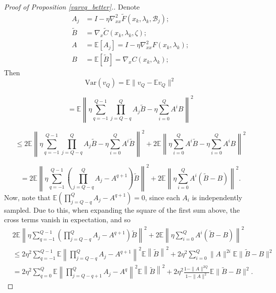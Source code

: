 \documentclass[11pt, twoside]{report}
\begin{document}
\begin{proof}[Proof of Proposition \ref{varvq_better}.]
Denote
\begin{align*}
    A_j &= I- \eta \nabla_{xx}^2 \tilde{F}(x_k,\lambda_k, \mathcal{B}_j); \\
    \tilde{B} &= \nabla_x \tilde{C} (x_k,\lambda_k,\zeta); \\
    A &= \mathbb{E} \left[ A_j \right] = I- \eta \nabla_{xx}^2 F(x_k,\lambda_k); \\
    B &= \mathbb{E} \left[\tilde{B} \right] = \nabla_x C (x_k,\lambda_k);
\end{align*}
Then 
\[\mathrm{Var}(v_Q) = \mathbb{E} \|v_Q - \mathbb{E}v_Q \|^2\]

\[= \mathbb{E} \left\|\eta \sum_{q=-1}^{Q-1} \prod_{j = Q-q}^Q A_j \tilde{B} - \eta \sum_{i=0}^Q A^i B \right\|^2\]

\[\leq 2 \mathbb{E} \left\| \eta \sum_{q=-1}^{Q-1} \prod_{j = Q-q}^Q A_j \tilde{B} - \eta \sum_{i=0}^Q A^i \tilde{B} \right\|^2 + 2\mathbb{E} \left\| \eta \sum_{i=0}^Q A^i \tilde{B} - \eta \sum_{i=0}^Q A^i B \right\|^2 \]

\[= 2 \mathbb{E} \left\| \eta \sum_{q=-1}^{Q-1} \left( \prod_{j = Q-q}^Q A_j - A^{q+1} \right) \tilde{B} \right\|^2 + 2\mathbb{E} \left\| \eta \sum_{i=0}^Q A^i (\tilde{B} - B) \right\|^2. \]
Now, note that $\mathbb{E}\left( \prod_{j = Q-q}^Q A_j - A^{q+1} \right) = 0$, since each $A_i$ is independently sampled. Due to this, when expanding the square of the first sum above, the cross terms vanish in expectation, and so
{\setlength{\abovedisplayskip}{6pt}
 \setlength{\belowdisplayskip}{6pt}
\begin{align*}
& 2 \mathbb{E} \left\| \eta \sum_{q=-1}^{Q-1} 
   \left( \prod_{j = Q-q}^Q A_j - A^{q+1} \right) \tilde{B} \right\|^2 + 2\mathbb{E} \left\| \eta \sum_{i=0}^Q A^i (\tilde{B} - B) \right\|^2 \\
&\leq 2 \eta^2 \sum_{q=-1}^{Q-1} 
   \mathbb{E} \left\| \prod_{j = Q-q}^Q A_j - A^{q+1} \right\|^2 
   \mathbb{E} \left\| \tilde{B} \right\|^2 + 2\eta^2 \sum_{i=0}^Q \|  A \|^{2i} \mathbb{E} \|\tilde{B} - B\|^2 \\
&= 2 \eta^2 \sum_{q=0}^{Q} 
   \mathbb{E} \left\| \prod_{j = Q-q+1}^Q A_j - A^{q} \right\|^2 
   \mathbb{E} \left\| \tilde{B} \right\|^2 + 2\eta^2 \frac{1-\|A\|^{2Q}}{1-\|A\|^2} 
   \mathbb{E} \|\tilde{B} - B\|^2.
\end{align*}}


\end{proof}
\end{document}
